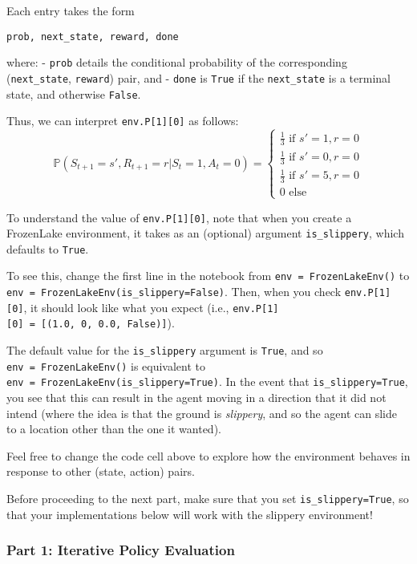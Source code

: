 \documentclass[11pt]{article}
\begin{document}
    Each entry takes the form

\begin{verbatim}
prob, next_state, reward, done
\end{verbatim}

where: - \texttt{prob} details the conditional probability of the
corresponding (\texttt{next\_state}, \texttt{reward}) pair, and -
\texttt{done} is \texttt{True} if the \texttt{next\_state} is a terminal
state, and otherwise \texttt{False}.

Thus, we can interpret \texttt{env.P{[}1{]}{[}0{]}} as follows: \[
\mathbb{P}(S_{t+1}=s',R_{t+1}=r|S_t=1,A_t=0) = \begin{cases}
               \frac{1}{3} \text{ if } s'=1, r=0\\
               \frac{1}{3} \text{ if } s'=0, r=0\\
               \frac{1}{3} \text{ if } s'=5, r=0\\
               0 \text{ else}
            \end{cases}
\]

To understand the value of \texttt{env.P{[}1{]}{[}0{]}}, note that when
you create a FrozenLake environment, it takes as an (optional) argument
\texttt{is\_slippery}, which defaults to \texttt{True}.

To see this, change the first line in the notebook from
\texttt{env\ =\ FrozenLakeEnv()} to
\texttt{env\ =\ FrozenLakeEnv(is\_slippery=False)}. Then, when you check
\texttt{env.P{[}1{]}{[}0{]}}, it should look like what you expect (i.e.,
\texttt{env.P{[}1{]}{[}0{]}\ =\ {[}(1.0,\ 0,\ 0.0,\ False){]}}).

The default value for the \texttt{is\_slippery} argument is
\texttt{True}, and so \texttt{env\ =\ FrozenLakeEnv()} is equivalent to
\texttt{env\ =\ FrozenLakeEnv(is\_slippery=True)}. In the event that
\texttt{is\_slippery=True}, you see that this can result in the agent
moving in a direction that it did not intend (where the idea is that the
ground is \emph{slippery}, and so the agent can slide to a location
other than the one it wanted).

Feel free to change the code cell above to explore how the environment
behaves in response to other (state, action) pairs.

Before proceeding to the next part, make sure that you set
\texttt{is\_slippery=True}, so that your implementations below will work
with the slippery environment!

    \subsubsection{Part 1: Iterative Policy
Evaluation}\label{part-1-iterative-policy-evaluation}
\end{document}
